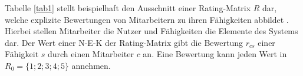 

Tabelle \ref{tab1} stellt beispielhaft den Ausschnitt einer Rating-Matrix $R$ dar, welche explizite Bewertungen von Mitarbeitern zu ihren Fähigkeiten abbildet \cite[S. 735]{adomavicius:inproceedings}\cite[S. 16]{link:booklet}.
Hierbei stellen Mitarbeiter die Nutzer und Fähigkeiten die Elemente des Systems dar.
Der Wert einer \ac{N-E-K} der Rating-Matrix gibt die Bewertung $r_{cs}$ einer Fähigkeit $s$ durch einen Mitarbeiter $c$ an.
Eine Bewertung kann jeden Wert in $R_{0}=\{1;2;3;4;5\}$ annehmen.

